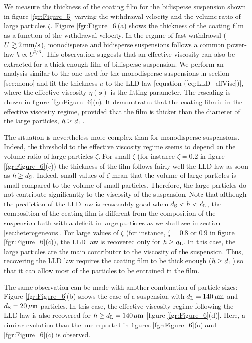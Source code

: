 \documentclass{jfm}
\begin{document}
We measure the thickness of the coating film for the bidisperse suspension shown in figure \ref{fgr:Figure_5} varying the withdrawal velocity and the volume ratio of large particles $\zeta$. Figure \ref{fgr:Figure_6}(a) shows the thickness of the coating film as a function of the withdrawal velocity. In the regime of fast withdrawal ($U \gtrsim 2\,{\rm mm/s}$), monodisperse and bidisperse suspensions follows a common power-law $h \propto U^{2/3}$. This observation suggests that an effective viscosity can also be extracted for a thick enough film of bidisperse suspension. We perform an analysis similar to the one used for the monodisperse suspensions in section \ref{sec:mono} and fit the thickness $h$ to the LLD law [equation (\ref{eq:LLD_effVisc})], where the effective viscosity $\eta(\phi)$ is the fitting parameter. The rescaling is shown in figure \ref{fgr:Figure_6}(c). It demonstrates that the coating film is in the effective viscosity regime, provided that the film is thicker than the diameter of the large particles, $h \geq d_{\rm L}$.

The situation is nevertheless more complex than for monodisperse suspensions. Indeed, the threshold to the effective viscosity regime seems to depend on the volume ratio of large particles $\zeta$. For small $\zeta$ (for instance $\zeta=0.2$ in figure \ref{fgr:Figure_6}(c)) the thickness of the film follows fairly well the LLD law as soon as $h \geq d_{\rm S}$. Indeed, small values of $\zeta$ mean that the volume of large particles is small compared to the volume of small particles. Therefore, the large particles do not contribute significantly to the viscosity of the suspension. Note that although the prediction of the LLD law is reasonably good when $d_{\rm S} < h < d_{\rm L}$, the composition of the coating film is different from the composition of the suspension bath with a deficit in large particles as we shall see in section \ref{sec:heterogeneous}. For large values of $\zeta$ (for instance, $\zeta=0.8$ or $0.9$ in figure \ref{fgr:Figure_6}(c)), the LLD law is recovered only for $h \geq d_{\rm L}$. In this case, the large particles are the main contributor to the viscosity of the suspension. Thus, recovering the LLD law requires the coating film to be thick enough ($h \geq d_{\rm L}$) so that it can allow most of the particles to be entrained in the film.

The same observation can be made with another combination of particle sizes: Figure \ref{fgr:Figure_6}(b) shows the case of a suspension with $d_{\rm L}=140\,\mu{\rm m}$ and $d_{\rm S}=20\,\mu{\rm m}$ particles. In this case, the effective viscosity regime following the LLD law is also recovered for
$h\geq d_{\rm L} = 140\,\mu{\rm m}$ [figure \ref{fgr:Figure_6}(d)]. Here, a similar evolution than the one reported in figures \ref{fgr:Figure_6}(a) and \ref{fgr:Figure_6}(c) is observed.
\end{document}
